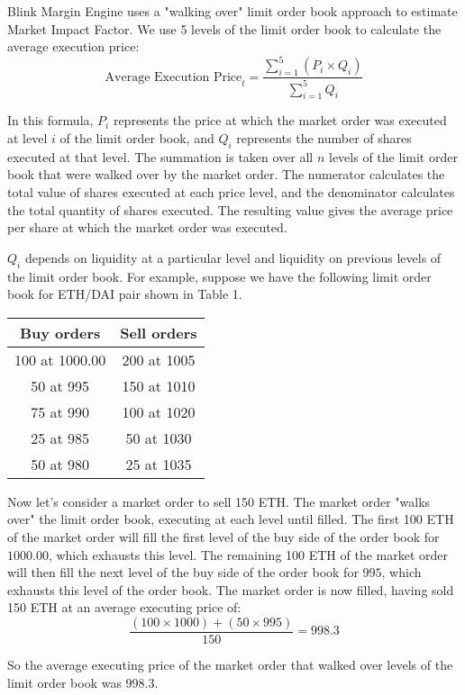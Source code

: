 \documentclass[conference]{IEEEtran}
\begin{document}
Blink Margin Engine uses a "walking over" limit order book approach to estimate Market Impact Factor. We use 5 levels of the limit order book to calculate the average execution price: $$ \text{Average Execution Price}_{t} = \frac{\sum\limits_{i=1}^{5} (P_i \times Q_i)}{\sum\limits_{i=1}^{5} Q_i} $$

In this formula, $P_i$ represents the price at which the market order was executed at level $i$ of the limit order book, and $Q_i$ represents the number of shares executed at that level. The summation is taken over all $n$ levels of the limit order book that were walked over by the market order. The numerator calculates the total value of shares executed at each price level, and the denominator calculates the total quantity of shares executed. The resulting value gives the average price per share at which the market order was executed.

$Q_i$ depends on liquidity at a particular level and liquidity on previous levels of the limit order book. For example, suppose we have the following limit order book for ETH/DAI pair shown in Table 1.

\begin{table}[h]
\centering
\begin{tabular}{| c | c |}
\hline
 Buy orders & Sell orders \\
\hline
 100  at 1000.00 & 200  at 1005 \\
 50  at 995 & 150  at 1010 \\
 75  at 990 & 100  at 1020 \\
 25  at 985 & 50  at 1030 \\
 50  at 980 & 25  at 1035 \\
\hline
\end{tabular}
\end{table}

Now let's consider a market order to sell 150 ETH. The market order "walks over" the limit order book, executing at each level until filled.
The first 100 ETH of the market order will fill the first level of the buy side of the order book for $1000.00$, which exhausts this level.
The remaining 100 ETH of the market order will then fill the next level of the buy side of the order book for $995$, which exhausts this level of the order book.
The market order is now filled, having sold 150 ETH at an average executing price of:
$$\frac{(100 \times 1000) + (50 \times 995)}{150} = 998.3$$



So the average executing price of the market order that walked over levels of the limit order book was $998.3$.
\end{document}

